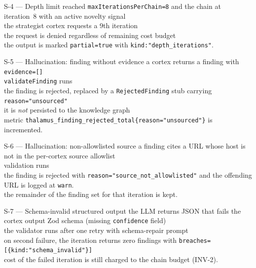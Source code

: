 \begin{scenario}{S-4 --- Depth limit reached}
\Given \texttt{maxIterationsPerChain=8} and the chain at iteration~8 with an active novelty signal \\
\When the strategist cortex requests a 9th iteration \\
\Then the request is denied regardless of remaining cost budget \\
\And the output is marked \texttt{partial=true} with \texttt{kind:"depth\_iterations"}.
\end{scenario}

\begin{scenario}{S-5 --- Hallucination: finding without evidence}
\Given a cortex returns a finding with \texttt{evidence=[]} \\
\When \texttt{validateFinding} runs \\
\Then the finding is rejected, replaced by a \texttt{RejectedFinding} stub carrying \texttt{reason="unsourced"} \\
\And it is \emph{not} persisted to the knowledge graph \\
\And metric \texttt{thalamus\_finding\_rejected\_total\{reason="unsourced"\}} is incremented.
\end{scenario}

\begin{scenario}{S-6 --- Hallucination: non-allowlisted source}
\Given a finding cites a URL whose host is not in the per-cortex source allowlist \\
\When validation runs \\
\Then the finding is rejected with \texttt{reason="source\_not\_allowlisted"} and the offending URL is logged at \texttt{warn}. \\
\And the remainder of the finding set for that iteration is kept.
\end{scenario}

\begin{scenario}{S-7 --- Schema-invalid structured output}
\Given the LLM returns JSON that fails the cortex output Zod schema (missing \texttt{confidence} field) \\
\When the validator runs after one retry with schema-repair prompt \\
\Then on second failure, the iteration returns zero findings with \texttt{breaches=[\{kind:"schema\_invalid"\}]} \\
\And cost of the failed iteration is still charged to the chain budget (INV-2).
\end{scenario}

